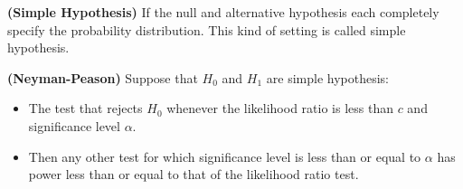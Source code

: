 \begin{definition}{\textbf{(Simple Hypothesis)}}
    If the null and alternative hypothesis each completely specify the probability distribution. This kind of setting is called simple hypothesis. 
\end{definition}

\begin{lemma}{\textbf{(Neyman-Peason)}}
    Suppose that $H_0$ and $H_1$ are simple hypothesis:
    \begin{itemize}
        \item The test that rejects $H_0$ whenever the likelihood ratio is less than $c$ and significance level $\alpha$. 
        \item Then any other test for which significance level is less than or equal to $\alpha$ has power less than or equal to that of the likelihood ratio test. 
    \end{itemize} 
\end{lemma}
